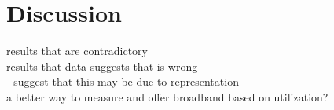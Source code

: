 \section{Discussion}
results that are contradictory\\
results that data suggests that is wrong\\ 
- suggest that this may be due to representation\\
a better way to measure and offer broadband based on utilization?
